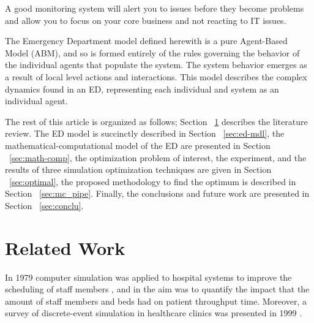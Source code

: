 \documentclass[11pt]{article} %
\begin{document}
A good monitoring system will alert you to issues before they become problems and allow you to focus 
on your core business and not reacting to IT issues. 

The Emergency Department model defined herewith is a pure Agent-Based Model (ABM), and so is formed entirely of the rules 
governing the behavior of the individual agents that populate the system. The system behavior emerges as a result of local level 
actions and interactions. This model describes the complex dynamics found in an ED, representing each individual and system as 
an individual agent. 

The rest of this article is organized as follows; Section ~\ref{sec:review} describes the literature review. The ED model is succinctly 
described in Section ~\ref{sec:ed-mdl}, the mathematical-computational model of the ED are presented in Section ~\ref{sec:math-comp}, the optimization problem of interest, the experiment, and the results of three simulation optimization techniques are given in 
Section ~\ref{sec:optimal}, the proposed methodology to find the optimum is described in Section ~\ref{sec:mc_pipe}. Finally,  the 
conclusions and future work  are presented in Section ~\ref{sec:conclu}.

\section{Related Work}
\label{sec:review}

In 1979 computer simulation was applied to hospital systems to improve the scheduling of staff members \cite{Hancock:1979p28}, 
and in \cite{Saunders:1989p134} the aim was to quantify the impact that the amount of staff members and beds had on patient 
throughput time. Moreover, a survey  of discrete-event simulation in healthcare clinics was presented in 1999 
\cite{Jacobson:1999p109}.
\end{document}

